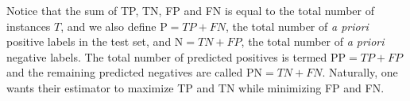 %
Notice that the sum of TP, TN, FP and FN is equal to the total number of instances $T$, and we also define $\text{P}=TP+FN$, the total number of \textit{a priori} positive labels in the test set, and $\text{N}=TN+FP$, the total number of \textit{a priori} negative labels. The total number of predicted positives is termed $\text{PP}=TP+FP$ and the remaining predicted negatives are called $\text{PN}=TN+FN$. %
%
%
%
Naturally, one wants their estimator to maximize TP and TN while minimizing FP and FN.


